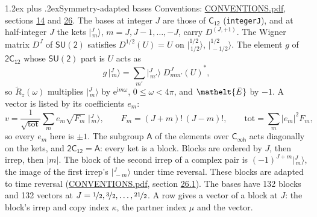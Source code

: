 \documentclass[10pt,a4paper]{article}
\makeatletter
\renewcommand\section{\@startsection{section}{1}{\z@}{-3ex plus -1ex minus -.2ex}%
  {1.2ex plus .2ex}{\normalfont\large\sffamily\bfseries\color{parttitle}}}
\numberwithin{equation}{section}
\newcommand{\eltfont}[1]{{\let\sigma\eltsigma\mathelt{#1}}}
\newcommand{\grp}[1]{\mathsf{#1}}
\newcommand{\elt}[1]{\eltfont{#1}}
\newcommand{\iunit}{\mathrm{i}}
\newcommand{\expe}{\mathrm{e}}
\newcommand{\irrJp}[2]{D^{(#1,#2)}}
\newcommand{\wignerD}[1]{D^{#1}}
\newcommand{\conj}[1]{{#1}^{*}}
\newcommand{\mult}{\kappa}
\newcommand{\intx}{\mu}
\newcommand{\jm}[2]{\bigl\lvert{}^{#1}_{\,#2}\bigr\rangle}
\newcommand{\barred}[1]{\bar{#1}}
\newcommand{\lift}[1]{\tilde{#1}}
\makeatother
\begin{document}
\section{Symmetry-adapted bases}\label{s:bases}
Conventions: \href{../../CONVENTIONS.pdf}{CONVENTIONS.pdf}, sections \href{../../../rotation/CONVENTIONS.pdf\#conv.14}{14} and \href{../../CONVENTIONS.pdf\#conv.26}{26}.
\leavevmode\label{n:index.m}\label{n:vector.ket}The bases at integer $J$ are those of \href{../../../rotation/data/pdf/C12.pdf}{$\grp{C_{12}}$} (\texttt{integerJ}), and at half-integer $J$ the kets $\jm{J}{m}$, $m = J, J-1, \dots, -J$, carry $\irrJp{J}{+1}$. \label{n:matrix.wigner}The Wigner matrix $\wignerD{J}$ of $\grp{SU(2)}$ satisfies $\wignerD{1/2}(U) = U$ on $\jm{1/2}{1/2}$, $\jm{1/2}{-1/2}$. The element $g$ of $\grp{2C_{12}}$ whose $\grp{SU(2)}$ part is $U$ acts as
\begin{equation}\label{e:action}g\,\jm{J}{m} = \sum_{m'} \jm{J}{m'}\; \conj{\wignerD{J}_{m m'}(U)},\end{equation}
so $\lift{R}_{z}(\omega)$ multiplies $\jm{J}{m}$ by $\expe^{\iunit m\omega}$, $0 \le \omega < 4\pi$, and $\elt{\barred{E}}$ by $-1$. \label{n:index.ketcoefficient}\label{n:vector.basis.symmetry}\label{n:index.ketweight}\label{n:index.total}A vector is listed by its coefficients $e_m$:
\begin{equation}\label{e:ket}v = \frac{1}{\sqrt{\mathrm{tot}}}\sum_m e_m\sqrt{F_m}\;\jm{J}{m},\qquad F_m = (J+m)!\,(J-m)!,\qquad \mathrm{tot} = \sum_m |e_m|^2F_m,\end{equation}
so every $e_m$ here is $\pm 1$.
\leavevmode\label{n:group.A}The subgroup $\grp{A}$ of the elements over $\grp{C_{\infty h}}$ acts diagonally on the kets, and $\grp{2C_{12}} = \grp{A}$: every ket is a block. Blocks are ordered by $J$, then irrep, then $|m|$. The block of the second irrep of a complex pair is $(-1)^{J+m}\jm{J}{m}$, the image of the first irrep's $\jm{J}{-m}$ under time reversal. These blocks are adapted to time reversal (\href{../../CONVENTIONS.pdf}{CONVENTIONS.pdf}, section \href{../../CONVENTIONS.pdf\#conv.26.1}{26.1}).
The bases have 132 blocks and 132 vectors at $J = \nicefrac{1}{2}, \nicefrac{3}{2}, \dots, \nicefrac{21}{2}$. \label{n:index.copy}\label{n:head.vector}A row gives a vector of a block at $J$: the block's irrep and copy index $\mult$, the partner index $\intx$ and the vector.
\end{document}
